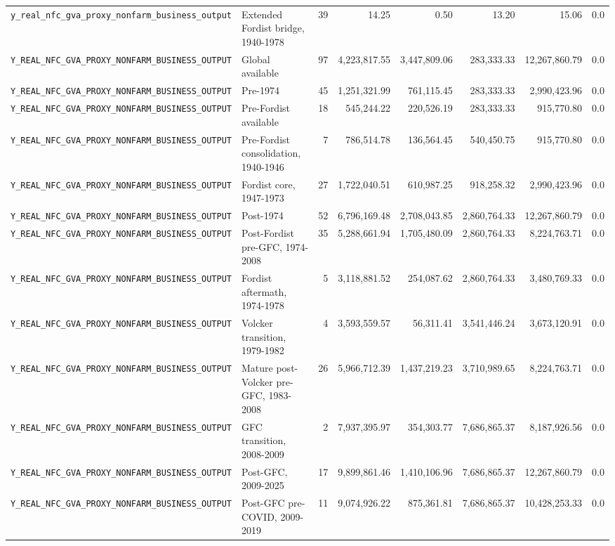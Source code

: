 \begin{landscape}
\begin{longtable}{p{4.4cm}p{3.8cm}rrrrrr}
\\
\nolinkurl{y_real_nfc_gva_proxy_nonfarm_business_output} & Extended Fordist bridge, 1940-1978 & 39 & 14.25 & 0.50 & 13.20 & 15.06 & 0.0
\\
\nolinkurl{Y_REAL_NFC_GVA_PROXY_NONFARM_BUSINESS_OUTPUT} & Global available & 97 & 4,223,817.55 & 3,447,809.06 & 283,333.33 & 12,267,860.79 & 0.0
\\
\nolinkurl{Y_REAL_NFC_GVA_PROXY_NONFARM_BUSINESS_OUTPUT} & Pre-1974 & 45 & 1,251,321.99 & 761,115.45 & 283,333.33 & 2,990,423.96 & 0.0
\\
\nolinkurl{Y_REAL_NFC_GVA_PROXY_NONFARM_BUSINESS_OUTPUT} & Pre-Fordist available & 18 & 545,244.22 & 220,526.19 & 283,333.33 & 915,770.80 & 0.0
\\
\nolinkurl{Y_REAL_NFC_GVA_PROXY_NONFARM_BUSINESS_OUTPUT} & Pre-Fordist consolidation, 1940-1946 & 7 & 786,514.78 & 136,564.45 & 540,450.75 & 915,770.80 & 0.0
\\
\nolinkurl{Y_REAL_NFC_GVA_PROXY_NONFARM_BUSINESS_OUTPUT} & Fordist core, 1947-1973 & 27 & 1,722,040.51 & 610,987.25 & 918,258.32 & 2,990,423.96 & 0.0
\\
\nolinkurl{Y_REAL_NFC_GVA_PROXY_NONFARM_BUSINESS_OUTPUT} & Post-1974 & 52 & 6,796,169.48 & 2,708,043.85 & 2,860,764.33 & 12,267,860.79 & 0.0
\\
\nolinkurl{Y_REAL_NFC_GVA_PROXY_NONFARM_BUSINESS_OUTPUT} & Post-Fordist pre-GFC, 1974-2008 & 35 & 5,288,661.94 & 1,705,480.09 & 2,860,764.33 & 8,224,763.71 & 0.0
\\
\nolinkurl{Y_REAL_NFC_GVA_PROXY_NONFARM_BUSINESS_OUTPUT} & Fordist aftermath, 1974-1978 & 5 & 3,118,881.52 & 254,087.62 & 2,860,764.33 & 3,480,769.33 & 0.0
\\
\nolinkurl{Y_REAL_NFC_GVA_PROXY_NONFARM_BUSINESS_OUTPUT} & Volcker transition, 1979-1982 & 4 & 3,593,559.57 & 56,311.41 & 3,541,446.24 & 3,673,120.91 & 0.0
\\
\nolinkurl{Y_REAL_NFC_GVA_PROXY_NONFARM_BUSINESS_OUTPUT} & Mature post-Volcker pre-GFC, 1983-2008 & 26 & 5,966,712.39 & 1,437,219.23 & 3,710,989.65 & 8,224,763.71 & 0.0
\\
\nolinkurl{Y_REAL_NFC_GVA_PROXY_NONFARM_BUSINESS_OUTPUT} & GFC transition, 2008-2009 & 2 & 7,937,395.97 & 354,303.77 & 7,686,865.37 & 8,187,926.56 & 0.0
\\
\nolinkurl{Y_REAL_NFC_GVA_PROXY_NONFARM_BUSINESS_OUTPUT} & Post-GFC, 2009-2025 & 17 & 9,899,861.46 & 1,410,106.96 & 7,686,865.37 & 12,267,860.79 & 0.0
\\
\nolinkurl{Y_REAL_NFC_GVA_PROXY_NONFARM_BUSINESS_OUTPUT} & Post-GFC pre-COVID, 2009-2019 & 11 & 9,074,926.22 & 875,361.81 & 7,686,865.37 & 10,428,253.33 & 0.0

\end{longtable}
\end{landscape}

